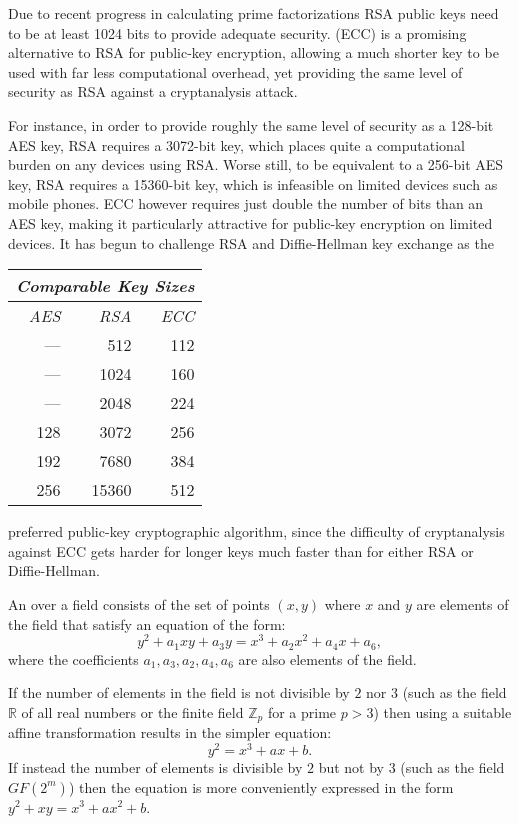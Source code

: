 
Due to recent progress in calculating prime factorizations RSA public keys
need to be at least 1024 bits to provide adequate security.
 (ECC) is a promising alternative
to RSA for public-key encryption, allowing a much shorter key to be used
with far less computational overhead, yet providing the same level of security
as RSA against a cryptanalysis attack.

\noindent
\begin{minipage}{95mm}
  For instance, in order to provide roughly the same level of security as a
  128-bit AES key, RSA requires a 3072-bit key, which places quite a computational
  burden on any devices using RSA. Worse still, to be equivalent to
  a 256-bit AES key, RSA requires a 15360-bit key, which is infeasible on limited
  devices such as mobile phones. ECC however requires just double the number of bits
  than an AES key, making it particularly attractive for public-key encryption on limited devices. It has begun to challenge
  RSA and Diffie-Hellman key exchange as the
\end{minipage}
\hfill
\begin{tabular}{|r|r|r|} \hline
  \multicolumn{3}{|l|}{\textit{Comparable Key Sizes}} \\ \hline\hline
  \textit{AES} & \textit{RSA} & \textit{ECC} \\ \hline
  --- & 512 & 112 \\
  --- & 1024 & 160 \\
  --- & 2048 & 224 \\
  128 & 3072 & 256 \\
  192 & 7680 & 384 \\
  256 & 15360 & 512 \\\hline
\end{tabular}
preferred public-key cryptographic algorithm, since the difficulty of cryptanalysis against ECC gets harder for longer keys much faster than for either RSA or Diffie-Hellman.

An  over a field consists of the set of points $(x,y)$
where $x$ and $y$ are elements of the field that satisfy an equation of the form:
\begin{displaymath}
  y^2 + a_1xy+a_3y = x^3+a_2x^2+a_4x+a_6,
\end{displaymath}
where the coefficients $a_1, a_3, a_2, a_4, a_6$ are also elements of the field.

If the number of elements in the field is not divisible by $2$ nor $3$
(such as the field $\mathbb{R}$ of all real numbers
or the finite field $\mathbb{Z}_p$ for a prime $p>3$)
then using a suitable affine transformation results in the simpler equation:
\begin{displaymath}
  y^2 = x^3+ax+b.
\end{displaymath}
If instead the number of elements is divisible by $2$ but not by $3$
(such as the field $GF(2^m)$) then the equation is more
conveniently expressed in the form $y^2+xy=x^3+ax^2+b$.

